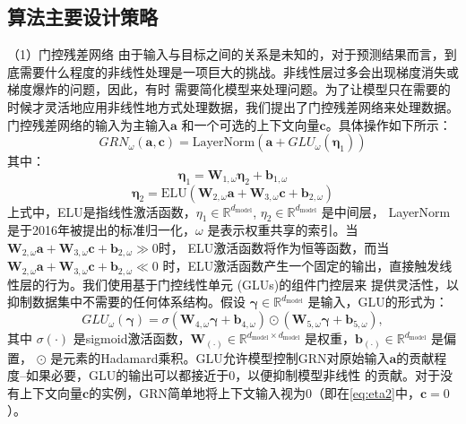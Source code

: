 \subsection{算法主要设计策略}
（1）门控残差网络
由于输入与目标之间的关系是未知的，对于预测结果而言，到底需要什么程度的非线性处理是一项巨大的挑战。非线性层过多会出现梯度消失或梯度爆炸的问题，因此，有时
需要简化模型来处理问题。为了让模型只在需要的时候才灵活地应用非线性地方式处理数据，我们提出了门控残差网络来处理数据。门控残差网络的输入为主输入$\mathbf{a}$
和一个可选的上下文向量$\mathbf{c}$。具体操作如下所示：
\begin{equation}
    GRN_{\omega}(\mathbf{a}, \mathbf{c}) = \text{LayerNorm}(\mathbf{a} + GLU_{\omega}(\boldsymbol{\eta}_1))
\end{equation}
其中：
\begin{equation}
    \boldsymbol{\eta}_1 = \mathbf{W}_{1,\omega} \boldsymbol{\eta}_2 + \mathbf{b}_{1,\omega}
\end{equation}
\begin{equation}
    \boldsymbol{\eta}_2 = \text{ELU}(\mathbf{W}_{2,\omega} \mathbf{a} + \mathbf{W}_{3,\omega} \mathbf{c} + \mathbf{b}_{2,\omega})
    \label{eq:eta2}
\end{equation}
上式中，ELU是指线性激活函数，$\eta_1 \in \mathbb{R}^{d_{\text{model}}}$, $\eta_2 \in \mathbb{R}^{d_{\text{model}}}$ 是中间层，
LayerNorm是于2016年被提出的标准归一化，$\omega$ 是表示权重共享的索引。当$\mathbf{W}_{2,\omega} \mathbf{a} + \mathbf{W}_{3,\omega} \mathbf{c} + \mathbf{b}_{2,\omega} \gg 0$时，
ELU激活函数将作为恒等函数，而当$\mathbf{W}_{2,\omega} \mathbf{a} + \mathbf{W}_{3,\omega} \mathbf{c} + \mathbf{b}_{2,\omega} \ll 0$ 时，ELU激活函数产生一个固定的输出，直接触发线性层的行为。我们使用基于门控线性单元 (GLUs)的组件门控层来
提供灵活性，以抑制数据集中不需要的任何体系结构。假设 $\boldsymbol{\gamma } \in \mathbb{R}^{d_{\text{model}}}$ 是输入，GLU的形式为：
\begin{equation}
    GLU_{\omega}(\boldsymbol{\gamma }) = \sigma(\mathbf{W}_{4,\omega} \mathbf{\boldsymbol{\gamma }} + \mathbf{b}_{4,\omega}) \odot (\mathbf{W}_{5,\omega} \mathbf{\boldsymbol{\gamma }} + \mathbf{b}_{5,\omega}),
\end{equation}
其中 $\sigma(\cdot)$ 是sigmoid激活函数，$\mathbf{W}_{(\cdot)} \in \mathbb{R}^{d_{\text{model}} \times d_{\text{model}}}$ 是权重，$\mathbf{b}_{(\cdot)} \in \mathbb{R}^{d_{\text{model}}}$ 是偏置，
$\odot $ 是元素的Hadamard乘积。GLU允许模型控制GRN对原始输入$\mathbf{a}$的贡献程度--如果必要，GLU的输出可以都接近于0，以便抑制模型非线性
的贡献。对于没有上下文向量$\mathbf{c}$的实例，GRN简单地将上下文输入视为0（即在\eqref{eq:eta2}中，$\mathbf{c}=0$）。

